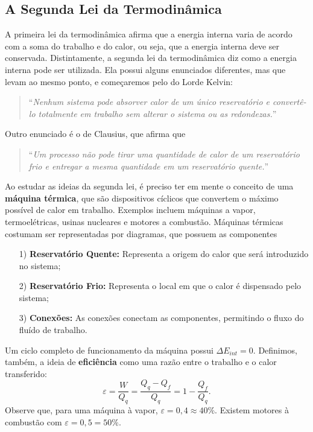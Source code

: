 \documentclass{article}
\begin{document}
\subsection{A Segunda Lei da Termodinâmica}
A primeira lei da termodinâmica afirma que a energia interna varia de acordo com a soma do trabalho e do calor, ou seja, que a 
energia interna deve ser conservada. Distintamente, a segunda lei da termodinâmica diz como a energia interna pode ser utilizada.
Ela possui alguns enunciados diferentes, mas que levam ao mesmo ponto, e começaremos pelo do Lorde Kelvin:
\begin{quote}
  ``\textit{Nenhum sistema pode absorver calor de um único reservatório e convertê-lo totalmente em trabalho sem alterar o sistema ou as redondezas.}''
\end{quote}
Outro enunciado é o de Clausius, que afirma que 
\begin{quote}
  ``\textit{Um processo não pode tirar uma quantidade de calor de um reservatório frio e entregar a mesma quantidade em um reservatório quente.}''
\end{quote}
Ao estudar as ideias da segunda lei, é preciso ter em mente o conceito de uma \textbf{máquina térmica}, que são dispositivos cíclicos 
que convertem o máximo possível de calor em trabalho. Exemplos incluem máquinas a vapor, termoelétricas, usinas nucleares e motores a combustão.
Máquinas térmicas costumam ser representadas por diagramas, que possuem as componentes
\begin{itemize}
  \item[1)] \textbf{Reservatório Quente:} Representa a origem do calor que será introduzido no sistema;
  \item[2)] \textbf{Reservatório Frio:} Representa o local em que o calor é dispensado pelo sistema;
  \item[3)] \textbf{Conexões:} As conexões conectam as componentes, permitindo o fluxo do fluído de trabalho.
\end{itemize}
Um ciclo completo de funcionamento da máquina possui \(\Delta E_{int} = 0.\) Definimos, também, a ideia de \textbf{eficiência} como uma 
razão entre o trabalho e o calor transferido:
\[
  \varepsilon  = \frac{W}{Q_{q}} = \frac{Q_{q}-Q_{f}}{Q_{q}} = 1 - \frac{Q_{f}}{Q_{q}}.
\]
Observe que, para uma máquina à vapor, \(\varepsilon = 0,4\approx 40\%\). Existem motores à combustão com \(\varepsilon = 0,5 = 50\%\).
\end{document}
